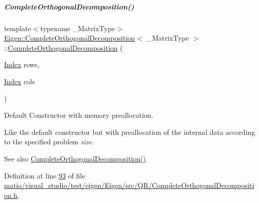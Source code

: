 \mbox{\label{group___q_r___module_aa6c282dd7452ebe754024edb71bebd09}} 
\subparagraph{\texorpdfstring{Complete\+Orthogonal\+Decomposition()}{CompleteOrthogonalDecomposition()}\hspace{0.1cm}{\footnotesize\ttfamily [6/8]}}
{\footnotesize\ttfamily template$<$typename \+\_\+\+Matrix\+Type$>$ \\
\hyperlink{group___q_r___module_class_eigen_1_1_complete_orthogonal_decomposition}{Eigen\+::\+Complete\+Orthogonal\+Decomposition}$<$ \+\_\+\+Matrix\+Type $>$\+::\hyperlink{group___q_r___module_class_eigen_1_1_complete_orthogonal_decomposition}{Complete\+Orthogonal\+Decomposition} (\begin{DoxyParamCaption}\item[{\hyperlink{namespace_eigen_a62e77e0933482dafde8fe197d9a2cfde}{Index}}]{rows,  }\item[{\hyperlink{namespace_eigen_a62e77e0933482dafde8fe197d9a2cfde}{Index}}]{cols }\end{DoxyParamCaption})\hspace{0.3cm}{\ttfamily [inline]}}



Default Constructor with memory preallocation. 

Like the default constructor but with preallocation of the internal data according to the specified problem {\itshape size}. \begin{DoxySeeAlso}{See also}
\hyperlink{group___q_r___module_a7ba33814fd3fdc62f6179cdcd655c679}{Complete\+Orthogonal\+Decomposition()} 
\end{DoxySeeAlso}


Definition at line \hyperlink{matio_2visual__studio_2test_2eigen_2_eigen_2src_2_q_r_2_complete_orthogonal_decomposition_8h_source_l00093}{93} of file \hyperlink{matio_2visual__studio_2test_2eigen_2_eigen_2src_2_q_r_2_complete_orthogonal_decomposition_8h_source}{matio/visual\+\_\+studio/test/eigen/\+Eigen/src/\+Q\+R/\+Complete\+Orthogonal\+Decomposition.\+h}.

